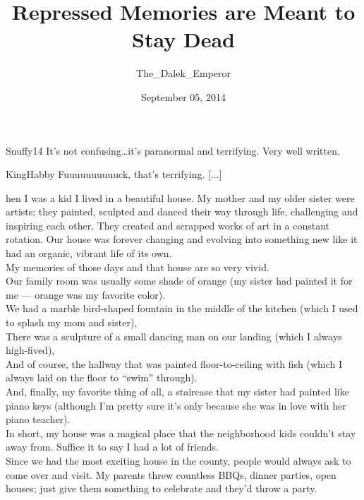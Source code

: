 \documentclass[a5paper]{scrartcl}
\title{Repressed Memories are Meant to Stay Dead}
\author{The\_Dalek\_Emperor}
\date{September 05, 2014}
\begin{document}
\maketitle

\begin{shadequote}[l]{Snuffy14}
It's not confusing\dots it's paranormal and terrifying. Very well written.
\end{shadequote}

\begin{shadequote}[l]{KingHabby}
Fuuuuuuuuuuck, that's terrifying. [...]
\end{shadequote}
\clearpage

hen I was a kid I lived in a beautiful house. My mother and my older sister were artists; they painted, sculpted and danced their way through life, challenging and inspiring each other. They created and scrapped works of art in a constant rotation. Our house was forever changing and evolving into something new like it had an organic, vibrant life of its own. \\


My memories of those days and that house are so very vivid. \\


Our family room was usually some shade of orange (my sister had painted it for me --- orange was my favorite color).\\


We had a marble bird-shaped fountain in the middle of the kitchen (which I used to splash my mom and sister),\\


There was a sculpture of a small dancing man on our landing (which I always high-fived), \\


And of course, the hallway that was painted floor-to-ceiling with fish (which I always laid on the floor to \enquote{swim} through).\\


And, finally, my favorite thing of all, a staircase that my sister had painted like piano keys (although I'm pretty sure it's only because she was in love with her piano teacher). \\


In short, my house was a magical place that the neighborhood kids couldn't stay away from. Suffice it to say I had a lot of friends.\\


Since we had the most exciting house in the county, people would always ask to come over and visit. My parents threw countless BBQs, dinner parties, open houses; just give them something to celebrate and they'd throw a party. \\
\end{document}
